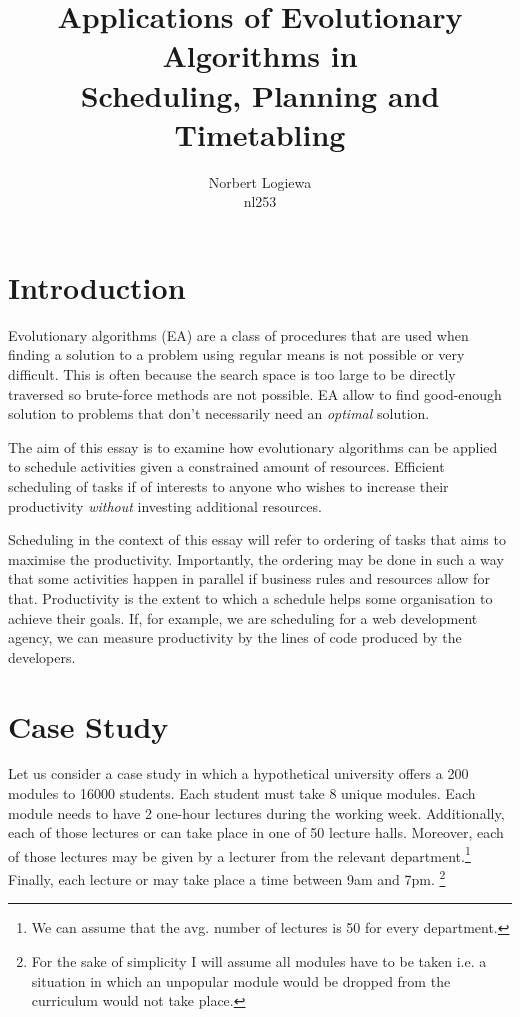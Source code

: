\documentclass[a4paper, 12pt, draft, titlepage]{article}
\date{} %
\author{Norbert Logiewa\\nl253}
\title{Applications of Evolutionary Algorithms in \\Scheduling, Planning and Timetabling}
\begin{document}
\maketitle

\section*{Introduction}

Evolutionary algorithms (EA) are a class of procedures that are used when 
finding a solution to a problem using regular means is not
possible or very difficult. This is often because the search space is too
large to be directly traversed so brute-force methods are not possible.
EA allow to find good-enough solution to problems that don't necessarily
need an \emph{optimal} solution.

The aim of this essay is to examine how evolutionary algorithms can be 
applied to schedule activities given a constrained amount of resources.
Efficient scheduling of tasks if of interests to anyone who wishes
to increase their productivity \emph{without} investing additional resources.

Scheduling in the context of this essay will refer to ordering of tasks 
that aims to maximise the productivity. Importantly, the ordering may be 
done in such a way that some activities happen in parallel if business rules
and resources allow for that.
Productivity is the extent to which a schedule helps some organisation 
to achieve their goals. If, for example, we are scheduling for a web development 
agency, we can measure productivity by the lines of code produced by the
developers.

\section*{Case Study}

Let us consider a case study in which a hypothetical university offers
a 200 modules to 16000 students. Each student must take 8 unique
modules. Each module needs to have 2 one-hour lectures during the
working week. Additionally, each of those lectures or can take place
in one of 50 lecture halls. Moreover, each of those lectures may be
given by a lecturer from the relevant department.\footnote{We can assume that the
avg. number of lectures is 50 for every department.} Finally, each lecture
or may take place a time between 9am and 7pm.  \footnote{For the sake of
simplicity I will assume all modules have to be taken i.e.  a situation
in which an unpopular module would be dropped from the curriculum would
not take place.}
\end{document}
